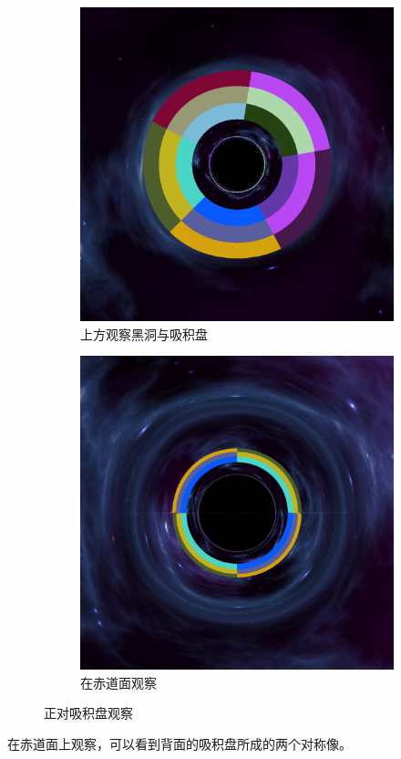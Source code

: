 \begin{figure}[H]
    \centering
    \begin{subfigure}{.5\textwidth}
        \centering
        \includegraphics[width=.8\linewidth]{images/disk_top.png}
        \caption{上方观察黑洞与吸积盘}
        \label{fig:disk_top}
    \end{subfigure}%
    \begin{subfigure}{.5\textwidth}
        \centering
        \includegraphics[width=.8\linewidth]{images/equatorial_plane.png}
        \caption{在赤道面观察}
        \label{fig:einstein-ring}
    \end{subfigure}
    \caption{正对吸积盘观察}
\end{figure}
在赤道面上观察，可以看到背面的吸积盘所成的两个对称像。

